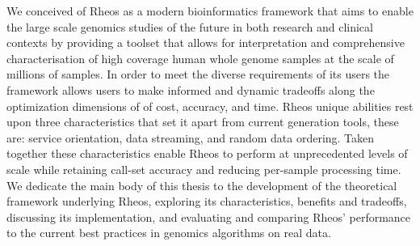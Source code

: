 We conceived of Rheos as a modern bioinformatics framework that aims to enable the large scale genomics studies of the future\autocite{england2016100,kaiser2016biden,margolis2014national} in both research and clinical contexts by providing a toolset that allows for interpretation and comprehensive characterisation of high coverage human whole genome samples at the scale of millions of samples. In order to meet the diverse requirements of its users the framework allows users to make informed and dynamic tradeoffs along the optimization dimensions of of cost, accuracy, and time. Rheos unique abilities rest upon three characteristics that set it apart from current generation tools, these are: service orientation, data streaming, and random data ordering. Taken together these characteristics enable Rheos to perform at unprecedented levels of scale while retaining call-set accuracy and reducing per-sample processing time. We dedicate the main body of this thesis to the development of the theoretical framework underlying Rheos, exploring its characteristics, benefits and tradeoffs, discussing its implementation, and evaluating and comparing Rheos' performance to the current best practices in genomics algorithms on real data.  

